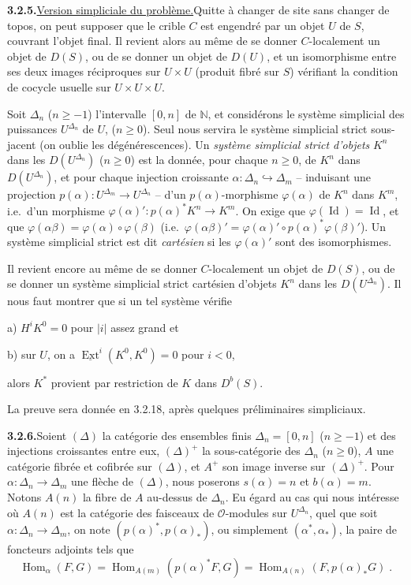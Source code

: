 \documentclass[12pt,a4paper]{article}
\theoremstyle{plain}
\theoremstyle{definition}
\DeclareMathOperator{\Hom}{Hom}
\DeclareMathOperator{\Ext}{Ext}
\DeclareMathOperator{\Id}{Id}
\begin{document}
\smallskip
\noindent\textbf{3.2.5.}\quad \underline{Version simpliciale du probl\`eme.}\quad Quitte \`a changer de site sans changer de topos, on peut supposer que le crible $C$ est engendr\'e par un objet $U$ de $S$, couvrant l'objet final. Il revient alors au m\^eme de se donner $C$-localement un objet de $D(S)$, ou de se donner un objet de $D(U)$, et un isomorphisme entre ses deux images r\'eciproques sur $U \times U$ (produit fibr\'e sur $S$) v\'erifiant la condition de cocycle usuelle sur $U \times U \times U$.

Soit $\Delta_n$ ($n \geqslant -1$) l'intervalle $[0, n]$ de $\mathbb{N}$, et consid\'erons le syst\`eme simplicial des puissances $U^{\Delta_n}$ de $U$, ($n \geqslant 0$). Seul nous servira le syst\`eme simplicial strict sous-jacent (on oublie les d\'eg\'en\'erescences). Un \emph{syst\`eme simplicial strict d'objets} $K^n$ dans les $D(U^{\Delta_n})$ ($n \geqslant 0$) est la donn\'ee, pour chaque $n \geqslant 0$, de $K^n$ dans $D(U^{\Delta_n})$, et pour chaque injection croissante $\alpha : \Delta_n \hookrightarrow \Delta_m$ -- induisant une projection $p(\alpha) : U^{\Delta_m} \to U^{\Delta_n}$ -- d'un $p(\alpha)$-morphisme $\varphi(\alpha)$ de $K^n$ dans $K^m$, i.e.\ d'un morphisme $\varphi(\alpha)' : p(\alpha)^* K^n \to K^m$. On exige que $\varphi(\Id) = \Id$, et que $\varphi(\alpha\beta) = \varphi(\alpha) \circ \varphi(\beta)$ (i.e.\ $\varphi(\alpha\beta)' = \varphi(\alpha)' \circ p(\alpha)^* \varphi(\beta)'$). Un syst\`eme simplicial strict est dit \emph{cart\'esien} si les $\varphi(\alpha)'$ sont des isomorphismes.

Il revient encore au m\^eme de se donner $C$-localement un objet de $D(S)$, ou de se donner un syst\`eme simplicial strict cart\'esien d'objets $K^n$ dans les $D(U^{\Delta_n})$. Il nous faut montrer que si un tel syst\`eme v\'erifie

a) $H^i K^0 = 0$ pour $|i|$ assez grand et

b) sur $U$, on a $\underline{\Ext}^i(K^0, K^0) = 0$ pour $i < 0$,

alors $K^*$ provient par restriction de $K$ dans $D^b(S)$.

La preuve sera donn\'ee en 3.2.18, apr\`es quelques pr\'eliminaires simpliciaux.

\smallskip
\noindent\textbf{3.2.6.}\quad Soient $(\Delta)$ la cat\'egorie des ensembles finis $\Delta_n = [0, n]$ ($n \geqslant -1$) et des injections croissantes entre eux, $(\Delta)^+$ la sous-cat\'egorie des $\Delta_n$ ($n \geqslant 0$), $A$ une cat\'egorie fibr\'ee et cofibr\'ee sur $(\Delta)$, et $A^+$ son image inverse sur $(\Delta)^+$. Pour $\alpha : \Delta_n \to \Delta_m$ une fl\`eche de $(\Delta)$, nous poserons $s(\alpha) = n$ et $b(\alpha) = m$. Notons $A(n)$ la fibre de $A$ au-dessus de $\Delta_n$. Eu \'egard au cas qui nous int\'eresse o\`u $A(n)$ est la cat\'egorie des faisceaux de $\mathcal{O}$-modules sur $U^{\Delta_n}$, quel que soit $\alpha : \Delta_n \to \Delta_m$, on note $(p(\alpha)^*, p(\alpha)_*)$, ou simplement $(\alpha^*, \alpha_*)$, la paire de foncteurs adjoints tels que
\[
\Hom_\alpha(F, G) = \Hom_{A(m)}(p(\alpha)^* F, G) = \Hom_{A(n)}(F, p(\alpha)_* G)\;.
\]
\end{document}
